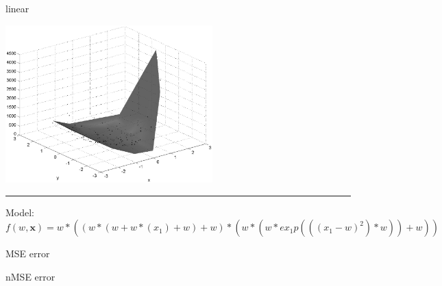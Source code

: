 \documentclass[12pt]{article}
\begin{document}
\begin{multicols}{2}
\begin{bundle}{linear}\end{bundle}

\columnbreak
\includegraphics[width=8cm]{7.eps}
\end{multicols}

\hrule
\vspace{1cm}
Model: $f(w,\mathbf{x})=w*((w*(w+w*(x_1)+w)+w)*(w*(w*ex_1p(((x_1-w)^2)*w))+w))$

MSE error

nMSE error
\end{document}
